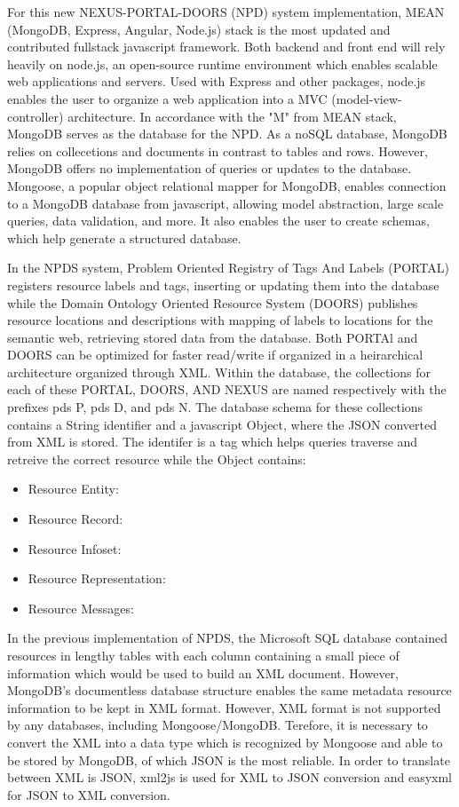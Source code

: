 \documentclass[10pt,twocolumn,twoside]{article}
\begin{document}
	For this new NEXUS-PORTAL-DOORS (NPD) system implementation, MEAN (MongoDB, Express, Angular, Node.js)  stack is the most updated and contributed fullstack javascript framework. Both backend and front end will rely heavily on node.js, an open-source runtime environment which enables scalable web applications and servers. Used with Express and other packages, node.js enables the user to organize a web application into a MVC (model-view-controller) architecture. In accordance with the "M" from MEAN stack, MongoDB serves as the database for the NPD. As a noSQL database, MongoDB relies on collecetions and documents in contrast to tables and rows. However, MongoDB offers no implementation of queries or updates to the database. Mongoose, a popular object relational mapper for MongoDB, enables connection to a MongoDB database from javascript, allowing model abstraction, large scale queries, data validation, and more. It also enables the user to create schemas, which help generate a structured database. \newline
	
	In the NPDS system, Problem Oriented Registry of Tags And Labels (PORTAL) registers resource labels and tags, inserting or updating them into the database while the Domain Ontology Oriented Resource System (DOORS) publishes resource locations and descriptions with mapping of labels to locations for the semantic web, retrieving stored data from the database. Both PORTAl and DOORS can be optimized for faster read/write if organized in a heirarchical architecture organized through XML. Within the database, the collections for each of these PORTAL, DOORS, AND NEXUS are named respectively with the prefixes pds P, pds D, and pds N. The database schema for these collections contains a String identifier and a javascript Object, where the JSON converted from XML is stored. The identifer is a tag which helps queries traverse and retreive the correct resource while the Object contains:\newline

\begin{itemize}
  \item Resource Entity: 
  \item Resource Record:
  \item Resource Infoset: 
  \item Resource Representation:
  \item Resource Messages: 
\end{itemize}
	In the previous implementation of NPDS, the Microsoft SQL database contained resources in lengthy tables with each column containing a small piece of information which would be used to build an XML document. However, MongoDB's documentless database structure enables the same metadata resource information to be kept in XML format. However, XML format is not supported by any databases, including Mongoose/MongoDB. Terefore, it is necessary to convert the XML into a data type which is recognized by Mongoose and able to be stored by MongoDB, of which JSON is the most reliable. In order to translate between XML is JSON, xml2js is used for XML to JSON conversion and easyxml for JSON to XML conversion.  \newline
\end{document}
